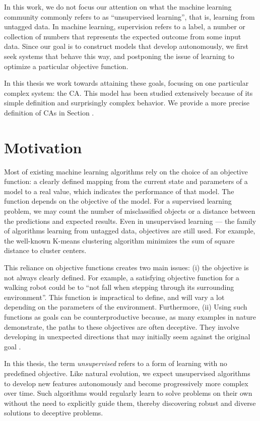 In this work, we do not focus our attention on what the machine learning
community commonly refers to as ``unsupervised learning'', that is, learning
from untagged data. In machine learning, supervision refers to a label, a number
or collection of numbers that represents the expected outcome from some input
data. Since our goal is to construct models that develop autonomously, we first
seek systems that behave this way, and postponing the issue of learning to
optimize a particular objective function.

In this thesis we work towards attaining these goals, focusing on one particular
complex system: the \acl{CA}. This model has been studied extensively
because of its simple definition and surprisingly complex behavior. We provide a
more precise definition of \aclp{CA} in Section .


\section{Motivation}

Most of existing machine learning algorithms rely on the choice of an objective
function: a clearly defined mapping from the current state and parameters of a
model to a real value, which indicates the performance of that model. The
function depends on the objective of the model. For a supervised learning
problem, we may count the number of misclassified objects or a distance between
the predictions and expected results. Even in unsupervised learning --- the family of
algorithms learning from untagged data, objectives are still used. For
example, the well-known K-means clustering algorithm minimizes the sum of square
distance to cluster centers.

This reliance on objective functions creates two main issues: (i) the objective
is not always clearly defined. For example, a satisfying objective function for
a walking robot could be to ``not fall when stepping through its surrounding
environment''. This function is impractical to define, and will vary a lot
depending on the parameters of the environment. Furthermore, (ii) Using such
functions as goals can be counterproductive because, as many examples in nature
demonstrate, the paths to these objectives are often deceptive. They involve
developing in unexpected directions that may initially seem against the original
goal \cite{stanleyWhyGreatnessCannot2015}.

In this thesis, the term \emph{unsupervised} refers to a form of learning with
no predefined objective. Like natural evolution, we expect unsupervised
algorithms to develop new features autonomously and become progressively more
complex over time. Such algorithms would regularly learn to solve problems on
their own without the need to explicitly guide them, thereby discovering robust
and diverse solutions to deceptive problems.



